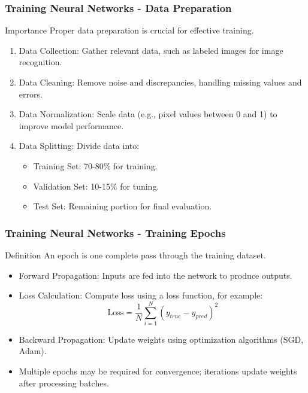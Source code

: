 \documentclass[aspectratio=169]{beamer}
\begin{document}
\begin{frame}
    \frametitle{Training Neural Networks - Data Preparation}
    \begin{block}{Importance}
        Proper data preparation is crucial for effective training.
    \end{block}
    
    \begin{enumerate}
        \item Data Collection: Gather relevant data, such as labeled images for image recognition.
        \item Data Cleaning: Remove noise and discrepancies, handling missing values and errors.
        \item Data Normalization: Scale data (e.g., pixel values between 0 and 1) to improve model performance.
        \item Data Splitting: Divide data into:
        \begin{itemize}
            \item Training Set: 70-80\% for training.
            \item Validation Set: 10-15\% for tuning.
            \item Test Set: Remaining portion for final evaluation.
        \end{itemize}
    \end{enumerate}
\end{frame}

\begin{frame}
    \frametitle{Training Neural Networks - Training Epochs}
    \begin{block}{Definition}
        An epoch is one complete pass through the training dataset.
    \end{block}
    
    \begin{itemize}
        \item Forward Propagation: Inputs are fed into the network to produce outputs.
        \item Loss Calculation: Compute loss using a loss function, for example:
        \begin{equation}
            \text{Loss} = \frac{1}{N} \sum_{i=1}^{N} (y_{true} - y_{pred})^2
        \end{equation}
        \item Backward Propagation: Update weights using optimization algorithms (SGD, Adam).
        \item Multiple epochs may be required for convergence; iterations update weights after processing batches.
    \end{itemize}
\end{frame}
\end{document}
